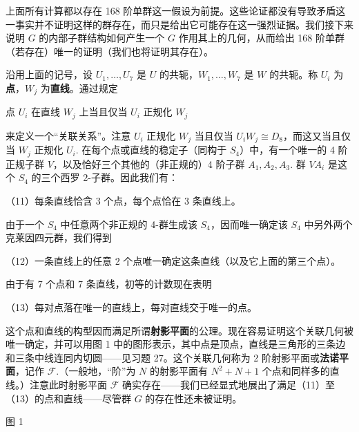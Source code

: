 上面所有计算都以存在 168 阶单群这一假设为前提。这些论证都没有导致矛盾这一事实并不证明这样的群存在，而只是给出它可能存在这一强烈证据。我们接下来说明 \(G\) 的内部子群结构如何产生一个 \(G\) 作用其上的几何，从而给出 168 阶单群（若存在）唯一的证明（我们也将证明其存在）。

沿用上面的记号，设 \(U_1, \ldots, U_7\) 是 \(U\) 的共轭，\(W_1, \ldots, W_7\) 是 \(W\) 的共轭。称 \(U_i\) 为\textbf{点}，\(W_j\) 为\textbf{直线}。通过规定
\begin{center}
点 \(U_i\) 在直线 \(W_j\) 上当且仅当 \(U_i\) 正规化 \(W_j\)
\end{center}
来定义一个“关联关系”。注意 \(U_i\) 正规化 \(W_j\) 当且仅当 \(U_iW_j \cong D_8\)，而这又当且仅当 \(W_j\) 正规化 \(U_i\). 在每个点或直线的稳定子（同构于 \(S_4\)）中，有一个唯一的 4 阶正规子群 \(V\)，以及恰好三个其他的（非正规的）4 阶子群 \(A_1, A_2, A_3\). 群 \(VA_i\) 是这个 \(S_4\) 的三个西罗 2-子群。因此我们有：

\noindent（11）每条直线恰含 3 个点，每个点恰在 3 条直线上。

由于一个 \(S_4\) 中任意两个非正规的 4-群生成该 \(S_4\)，因而唯一确定该 \(S_4\) 中另外两个克莱因四元群，我们得到

\noindent（12）一条直线上的任意 2 个点唯一确定这条直线（以及它上面的第三个点）。

由于有 7 个点和 7 条直线，初等的计数现在表明

\noindent（13）每对点落在唯一的直线上，每对直线交于唯一的点。

这个点和直线的构型因而满足所谓\textbf{射影平面}的公理。现在容易证明这个关联几何被唯一确定，并可以用图 1 中的图形表示，其中点是顶点，直线是三角形的三条边和三条中线连同内切圆——见习题 27。这个关联几何称为 2 阶射影平面或\textbf{法诺平面}，记作 \(\mathcal{F}\).（一般地，“阶”为 \(N\) 的射影平面有 \(N^2 + N + 1\) 个点和同样多的直线。）注意此时射影平面 \(\mathcal{F}\) 确实存在——我们已经显式地展出了满足（11）至（13）的点和直线——尽管群 \(G\) 的存在性还未被证明。

\begin{center}

图 1
\end{center}

